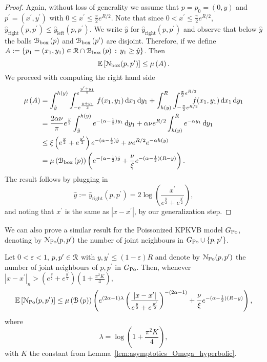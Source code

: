 \begin{proof}
Again, without loss of generality we assume that $p = p_0 = (0,y)$ and $p^\prime = (x^\prime, y^\prime)$ with $0 \le x^\prime \le \frac{\pi}{2} e^{R/2}$. Note that since $0 < x^\prime \le \frac{\pi}{2} e^{R/2}$,$ \hat{y}_{\mathrm{right}}(p,p^\prime) \le \hat{y}_{\mathrm{left}}(p,p^\prime)$. We write $\hat{y}$ for $\hat{y}_{\mathrm{right}}(p,p^\prime)$ and observe that below $\hat{y}$ the balls ${\mathcal B}_{\text{box}}\left(p\right)$ and ${\mathcal B}_{\text{box}}\left(p^\prime\right)$ are disjoint. Therefore, if we define $A := \left\{p_1 = (x_1,y_1) \in {\mathcal R} \cap {\mathcal B}_{\text{box}}\left(p\right) \, : \, y_1 \ge \hat{y} \right\}$. Then
\[
	\mathbb{E}\left[{\mathcal N}_{\text{box}}(p,p^\prime)\right] \le \mu\left(A\right).
\]
We proceed with computing the right hand side
\begin{align*}
	\Mu{A} &= \int_{\hat{y}}^{h(y)} 
		\int_{- e^{\frac{y + y_1}{2}}}^{e^{\frac{y^\prime+y_1}{2}}} 
		f(x_1,y_1) \dd x_1 \dd y_1
		+ \int_{h(y)}^{R} \int_{-\frac{\pi}{2}e^{R/2}}^{\frac{\pi}{2} e^{R/2}} 
		\hspace{-10pt}  f(x_1,y_1) \dd x_1 \dd y_1 \\
	&= \frac{2\alpha \nu}{\pi}e^{\frac{y}{2}}
		\int_{\hat{y}}^{h(y)} e^{-(\alpha - \frac{1}{2})y_1} \dd y_1 
		+ \alpha \nu e^{R/2} \int_{h(y)}^R e^{-\alpha y_1} \dd y_1\\
	&\le \xi\left(e^{\frac{y}{2}} + e^{\frac{y^\prime}{2}}\right) e^{-(\alpha-\frac{1}{2})\hat{y}}
		+ \nu e^{R/2} e^{-\alpha h(y)} \\
	&= \Mu{\BallPon{p}}\left(
		e^{-(\alpha-\frac{1}{2})\hat{y}} + \frac{\nu}{\xi} e^{-(\alpha - \frac{1}{2})(R-y)}\right).
\end{align*}
The result follows by plugging in 
\[
	\hat{y} := \hat{y}_{\text{right}}(p,p^\prime) = 2 \log\left(\frac{x^\prime}{e^{\frac{y}{2}} + e^{\frac{y^\prime}{2}}}\right),
\]
and noting that $x^\prime$ is the same as $|x - x^\prime|$, by our generalization step.

\end{proof} 

We can also prove a similar result for the Poissonized KPKVB model $G_{{\mathrm{Po}}}$, denoting by ${\mathcal N}_{{\mathrm{Po}}}(p,p^\prime)$ the number of joint neighbours in $G_{{\mathrm{Po}}} \cup \{p,p^\prime\}$.

\begin{lemma}\label{lem:common_neighbours_KPKVB}
Let $0 < \varepsilon < 1$, $p, p^\prime \in {\mathcal R}$ with $y,y^\prime \le (1-\varepsilon)R$ and denote by ${\mathcal N}_{{\mathrm{Po}}}(p,p^\prime)$ the number of joint neighbours of $p, p^\prime$ in $G_{{\mathrm{Po}}}$. Then, whenever $|x - x^\prime|_n > \left(e^{\frac{y}{2}} + e^{\frac{y^\prime}{2}}\right)\left(1 + \frac{\pi^2 K}{4}\right)$,
\[
	\mathbb{E}\left[{\mathcal N}_{{\mathrm{Po}}}(p,p^\prime)\right] \le \mu\left({\mathcal B}\left(p\right)\right)
	\left(e^{(2\alpha - 1)\lambda} \left(\frac{|x - x^\prime|}{e^{\frac{y}{2}} + e^{\frac{y^\prime}{2}}}\right)^{-(2\alpha - 1)}  
	+ \frac{\nu}{\xi} e^{-(\alpha - \frac{1}{2})(R-y)}\right),
\]
where
\[
	\lambda = \log\left(1 + \frac{\pi^2 K}{4}\right),
\]
with $K$ the constant from Lemma~\ref{lem:asymptotics_Omega_hyperbolic}.
\end{lemma}

